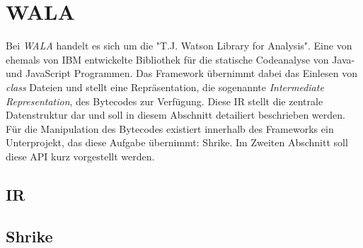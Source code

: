 \section{WALA}

Bei \textit{WALA} handelt es sich um die "T.J. Watson Library for Analysis". Eine von ehemals von IBM entwickelte 
Bibliothek für die statische Codeanalyse von Java- und JavaScript Programmen. Das Framework übernimmt dabei das Einlesen 
von \textit{class} Dateien und stellt eine Repräsentation, die sogenannte \textit{Intermediate Representation}, des 
Bytecodes zur Verfügung. Diese IR stellt die zentrale Datenstruktur dar und soll in diesem Abschnitt detailiert 
beschrieben werden.
\\
Für die Manipulation des Bytecodes existiert innerhalb des Frameworks ein Unterprojekt, das diese Aufgabe übernimmt: 
Shrike. Im Zweiten Abschnitt soll diese API kurz vorgestellt werden.  

\subsection{IR}



\subsection{Shrike}